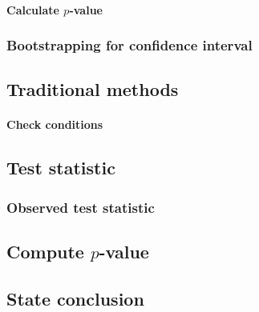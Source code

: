\documentclass[12pt, krantz2,]{krantz}
\let\oldparagraph\paragraph
\renewcommand{\paragraph}[1]{\oldparagraph{#1}\mbox{}}
\begin{document}
\hypertarget{calculate-p-value-3}{%
\paragraph{\texorpdfstring{Calculate \(p\)-value}{Calculate p-value}}\label{calculate-p-value-3}}

\hypertarget{bootstrapping-for-confidence-interval-3}{%
\subsubsection*{Bootstrapping for confidence interval}\label{bootstrapping-for-confidence-interval-3}}


\hypertarget{traditional-methods-3}{%
\subsection{Traditional methods}\label{traditional-methods-3}}

\hypertarget{check-conditions-3}{%
\paragraph{Check conditions}\label{check-conditions-3}}

\hypertarget{test-statistic-3}{%
\subsection{Test statistic}\label{test-statistic-3}}

\hypertarget{observed-test-statistic-3}{%
\subsubsection*{Observed test statistic}\label{observed-test-statistic-3}}


\hypertarget{compute-p-value-1}{%
\subsection{\texorpdfstring{Compute \(p\)-value}{Compute p-value}}\label{compute-p-value-1}}

\hypertarget{state-conclusion-3}{%
\subsection{State conclusion}\label{state-conclusion-3}}
\end{document}

